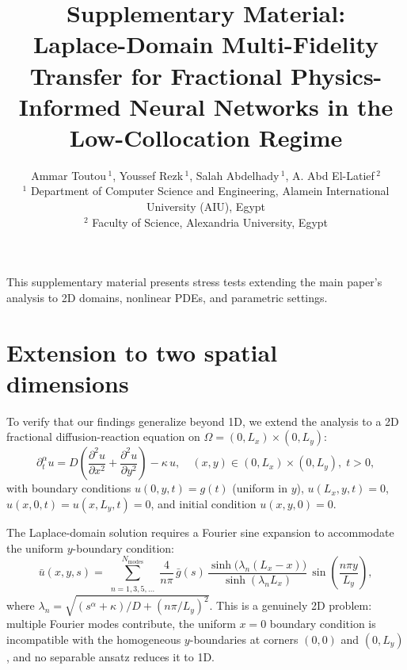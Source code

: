\documentclass[11pt]{article}
\begin{document}
\title{\vspace{-1.5em}\bfseries Supplementary Material:\\ Laplace-Domain Multi-Fidelity Transfer for Fractional
Physics-Informed Neural Networks in the Low-Collocation Regime\vspace{-0.5em}}

\author{
Ammar Toutou\,$^{1}$, \quad
Youssef Rezk\,$^{1}$, \quad
Salah Abdelhady\,$^{1}$, \quad
A. Abd El-Latief\,$^{2}$ \\[0.5em]
\normalsize $^{1}$ Department of Computer Science and Engineering, Alamein International University (AIU), Egypt \\
\normalsize $^{2}$ Faculty of Science, Alexandria University, Egypt
}

\date{}

\maketitle

\renewcommand{\thesection}{S\arabic{section}}
\renewcommand{\thetable}{S\arabic{table}}
\renewcommand{\thefigure}{S\arabic{figure}}
\renewcommand{\theequation}{S\arabic{equation}}

This supplementary material presents stress tests extending the main paper's analysis to 2D domains, nonlinear PDEs, and parametric settings.

\section{Extension to two spatial dimensions}
\label{sec:2d}

To verify that our findings generalize beyond 1D, we extend the analysis to a 2D fractional diffusion-reaction equation on $\Omega = (0, L_x) \times (0, L_y)$:
\begin{equation}
\label{eq:fdr_2d}
\partial_t^\alpha u = D\left(\frac{\partial^2 u}{\partial x^2} + \frac{\partial^2 u}{\partial y^2}\right) - \kappa\,u, \quad (x,y) \in (0, L_x) \times (0, L_y),\; t > 0,
\end{equation}
with boundary conditions $u(0, y, t) = g(t)$ (uniform in $y$), $u(L_x, y, t) = 0$, $u(x, 0, t) = u(x, L_y, t) = 0$, and initial condition $u(x, y, 0) = 0$.

The Laplace-domain solution requires a Fourier sine expansion to accommodate the uniform $y$-boundary condition:
\begin{equation}
\bar{u}(x, y, s) = \sum_{\substack{n=1,3,5,\ldots}}^{N_{\mathrm{modes}}} \frac{4}{n\pi}\, \bar{g}(s)\, \frac{\sinh\bigl(\lambda_n(L_x - x)\bigr)}{\sinh(\lambda_n L_x)}\, \sin\!\left(\frac{n\pi y}{L_y}\right),
\end{equation}
where $\lambda_n = \sqrt{(s^\alpha + \kappa)/D + (n\pi/L_y)^2}$. This is a genuinely 2D problem: multiple Fourier modes contribute, the uniform $x = 0$ boundary condition is incompatible with the homogeneous $y$-boundaries at corners $(0, 0)$ and $(0, L_y)$, and no separable ansatz reduces it to 1D.
\end{document}
